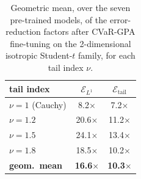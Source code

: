 \begin{table}
\centering\small
\caption{Geometric mean, over the seven pre-trained models, of the error-reduction factors after CVaR-GPA fine-tuning on the 2-dimensional isotropic Student-$t$ family, for each tail index $\nu$.}
\label{tab:studentt:factors:pernu}
\begin{tabular}{@{}l cc@{}}\toprule
tail index & $\mathcal{E}_{L^1}$ & $\mathcal{E}_{\mathrm{tail}}$\\ \midrule
$\nu=1$ (Cauchy) & 8.2$\times$ & 7.2$\times$\\
$\nu=1.2$ & 20.6$\times$ & 11.2$\times$\\
$\nu=1.5$ & 24.1$\times$ & 13.4$\times$\\
$\nu=1.8$ & 18.5$\times$ & 10.2$\times$\\
\midrule
\textbf{geom.\ mean} & \textbf{16.6}$\times$ & \textbf{10.3}$\times$\\
\bottomrule\end{tabular}
\end{table}
